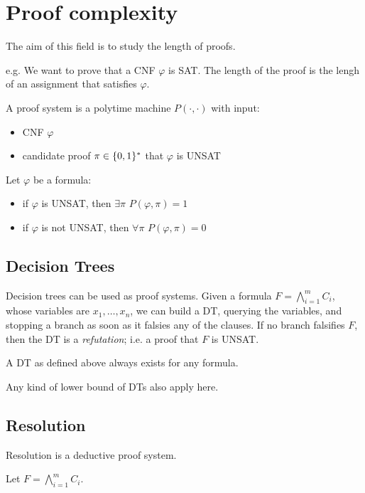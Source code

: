 \section{Proof complexity}\label{sec:proof_complexity}

The aim of this field is to study the length of proofs.

e.g. We want to prove that a CNF $\varphi$ is SAT.
The length of the proof is the lengh of an assignment that satisfies $\varphi$.

\begin{definition}\label{def:proof_system}
    A proof system is a polytime machine $P(\cdot, \cdot)$ with input:
    \begin{itemize}
        \item CNF $\varphi$
        \item candidate proof $\pi \in \{ 0,1 \}^*$ that $\varphi$ is UNSAT
    \end{itemize}
\end{definition}

Let $\varphi$ be a formula:
\begin{itemize}
    \item if $\varphi$ is UNSAT, then $\exists \pi$ $P(\varphi, \pi) = 1$
    \item if $\varphi$ is not UNSAT, then $\forall \pi$ $P(\varphi, \pi) = 0$
\end{itemize}


\subsection{Decision Trees}\label{subsec:proofsys_dt}
    Decision trees can be used as proof systems.
    Given a formula $F = \bigwedge_{i=1}^m C_i$, whose variables are $x_1, \dots, x_n$, we can build a DT, querying the variables, and stopping a branch as soon as it falsies any of the clauses.
    If no branch falsifies $F$, then the DT is a \textit{refutation}; i.e. a proof that $F$ is UNSAT.

    A DT as defined above always exists for any formula.

    Any kind of lower bound of DTs also apply here.


\subsection{Resolution}\label{subsec:resolution}
    Resolution is a deductive proof system.

    Let $F = \bigwedge_{i=1}^m C_i$.
    
